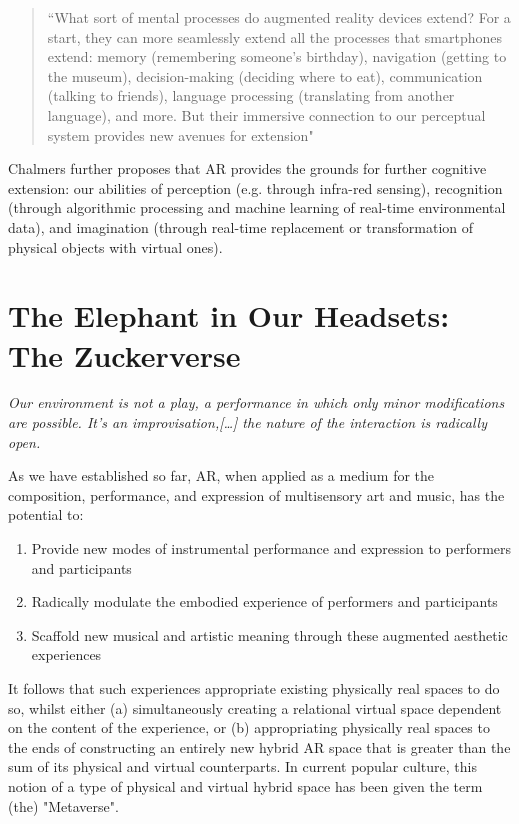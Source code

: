 \begin{quote}
    ``What sort of mental processes do augmented reality devices extend? For a start, they can more seamlessly extend all the processes that smartphones extend: memory (remembering someone's birthday), navigation (getting to the museum), decision-making (deciding where to eat), communication (talking to friends), language processing (translating from another language), and more. But their immersive connection to our perceptual system provides new avenues for extension" \citep[p. 299]{chalmers2022}
\end{quote}
Chalmers further proposes that AR provides the grounds for further cognitive extension: our abilities of perception (e.g. through infra-red sensing), recognition (through algorithmic processing and machine learning of real-time environmental data), and imagination (through real-time replacement or transformation of physical objects with virtual ones).



\section{The Elephant in Our Headsets: The Zuckerverse}\label{sec: theory-space}
\epigraph{\emph{Our environment is not a play, a performance in which only minor modifications are possible. It's an improvisation,[…] the nature of the interaction is radically open.}}{\citep{vermeulen2015}}
As we have established so far, AR, when applied as a medium for the composition, performance, and expression of multisensory art and music, has the potential to:
\begin{enumerate}
    \item Provide new modes of instrumental performance and expression to performers and participants
    \item Radically modulate the embodied experience of performers and participants
    \item Scaffold new musical and artistic meaning through these augmented aesthetic experiences
\end{enumerate}
It follows that such experiences appropriate existing physically real spaces to do so, whilst either (a) simultaneously creating a relational virtual space dependent on the content of the experience, or (b) appropriating physically real spaces to the ends of constructing an entirely new hybrid AR space that is greater than the sum of its physical and virtual counterparts. In current popular culture, this notion of a type of physical and virtual hybrid space has been given the term (the) "Metaverse".

